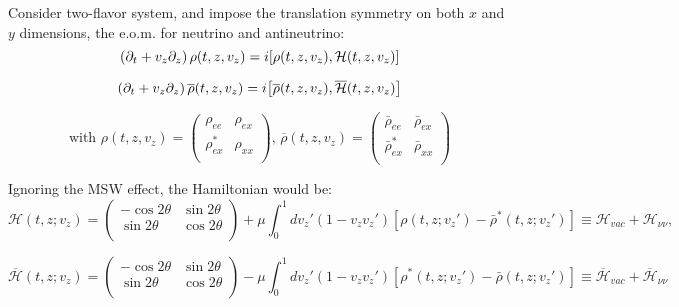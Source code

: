 \documentclass[11pt,a4paper]{article}
\begin{document}
 Consider two-flavor system, and impose the translation symmetry on both $x$ and $y$ dimensions, the e.o.m. for neutrino and antineutrino: 
\begin{equation*}
   \left(   \partial _{t} + v_{z}\partial_{z}\right)\rho(t,z,v_{z}) = i \comm{\rho(t,z,v_{z})}{\mathcal{H}(t,z,v_{z})}
\end{equation*}

\begin{equation*}
   \left(   \partial _{t} + v_{z}\partial_{z}\right)\overline{\rho}(t,z,v_{z}) = i \comm{\overline{\rho}(t,z,v_{z})}{\overline{\mathcal{H}}(t,z,v_{z})}
\end{equation*}

\begin{equation*}
   \text{with } \rho(t,z,v_{z}) = \begin{pmatrix}
      \rho_{ee} & \rho_{ex}\\
      \rho^{*}_{ex} & \rho_{x x}\\
   \end{pmatrix} \text{, }
   \overline{\rho}(t,z,v_{z}) = \begin{pmatrix}
      \bar\rho_{ee} & \bar\rho_{ex}\\
      \bar\rho^{*}_{ex} & \bar\rho_{x x}\\
   \end{pmatrix}
\end{equation*}

\noindent Ignoring the MSW effect, the Hamiltonian would be: 
\begin{equation*}
   \mathcal{H}(t,z;v_z)=
\begin{pmatrix}
 -\cos 2\theta & \sin 2\theta\\
\sin 2\theta & \cos 2\theta \\
\end{pmatrix}
+
\mu \int_0^1 dv_z' (1-v_{z} v_z')
[\rho(t,z;v_z')-\bar\rho^*(t,z;v_z')]
\equiv \mathcal{H}_{vac} + \mathcal{H}_{\nu\nu},
\end{equation*}

\begin{equation*}
   \overline{\mathcal{H}}(t,z;v_z)=
\begin{pmatrix}
   -\cos 2\theta & \sin 2\theta\\
    \sin 2\theta & \cos 2\theta \\
\end{pmatrix}
-
\mu \int_0^1 dv_z' (1-v_{z} v_z')
[\rho^*(t,z;v_z')-\bar\rho(t,z;v_z')]
\equiv \overline{\mathcal{H}}_{vac} + \overline{\mathcal{H}}_{\nu\nu}
\end{equation*}
\end{document}
